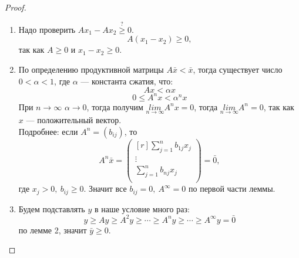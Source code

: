 \begin{proof}
    \ 
    \begin{enumerate}
        \item Надо проверить $Ax_1-Ax_2 \overset{?}{\geqslant} 0$.\\
        $$A(x_1-x_2)\geqslant 0,$$
        так как $A\geqslant 0$ и $x_1-x_2 \geqslant 0.$
        \item По определению продуктивной матрицы $A\bar x< \bar x$, тогда существует число $0<\alpha <1$, где $\alpha$ --- константа сжатия, что:
        $$Ax<\alpha x$$
        $$0\leqslant A^n x<\alpha^n x$$
        При $n\to \infty$ $\alpha \to 0$, тогда получим $\underset{n\to \infty}{lim}A^nx=0$, тогда $\underset{n\to \infty}{lim}A^n=0$, так как $x$ --- положительный вектор.\\
        Подробнее: если $A^n=(b_{ij})$, то 
        \[A^n \bar x = \begin{pmatrix}[r]
        \sum\limits_{j=1}^n b_{1j}x_j\\
        \vdots\\
        \sum\limits_{j=1}^n b_{nj}x_j\\
        \end{pmatrix}=\bar 0,\]
        где $x_j>0,~ b_{ij}\geqslant 0$. Значит все $b_{ij}=0,~A^{\infty}=0$ по первой части леммы.
        \item Будем подставлять $y$ в наше условие много раз: $$y\geqslant Ay \geqslant A^2y \geqslant \cdots \geqslant A^n y \geqslant \cdots \geqslant A^{\infty} y =\bar 0$$ по лемме 2, значит $\bar y \geqslant 0.$
    \end{enumerate}
\end{proof}
